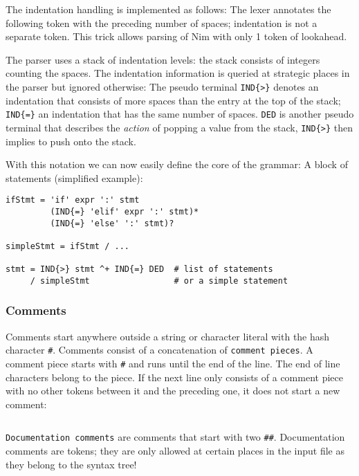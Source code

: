 The indentation handling is implemented as follows: The lexer annotates
the following token with the preceding number of spaces; indentation is
not a separate token. This trick allows parsing of Nim with only 1 token
of lookahead.

The parser uses a stack of indentation levels: the stack consists of
integers counting the spaces. The indentation information is queried at
strategic places in the parser but ignored otherwise: The pseudo
terminal \texttt{IND\{\textgreater{}\}} denotes an indentation that
consists of more spaces than the entry at the top of the stack;
\texttt{IND\{=\}} an indentation that has the same number of spaces.
\texttt{DED} is another pseudo terminal that describes the \emph{action}
of popping a value from the stack, \texttt{IND\{\textgreater{}\}} then
implies to push onto the stack.

With this notation we can now easily define the core of the grammar: A
block of statements (simplified example):

\begin{verbatim}
ifStmt = 'if' expr ':' stmt
         (IND{=} 'elif' expr ':' stmt)*
         (IND{=} 'else' ':' stmt)?

simpleStmt = ifStmt / ...

stmt = IND{>} stmt ^+ IND{=} DED  # list of statements
     / simpleStmt                 # or a simple statement
\end{verbatim}

\hypertarget{comments}{%
\subsubsection{Comments}\label{comments}}

Comments start anywhere outside a string or character literal with the
hash character \texttt{\#}. Comments consist of a concatenation of
\texttt{comment\ pieces}. A comment piece starts with \texttt{\#} and
runs until the end of the line. The end of line characters belong to the
piece. If the next line only consists of a comment piece with no other
tokens between it and the preceding one, it does not start a new
comment:

\begin{verbatim}
\end{verbatim}

\texttt{Documentation\ comments} are comments that start with two
\texttt{\#\#}. Documentation comments are tokens; they are only allowed
at certain places in the input file as they belong to the syntax tree!

